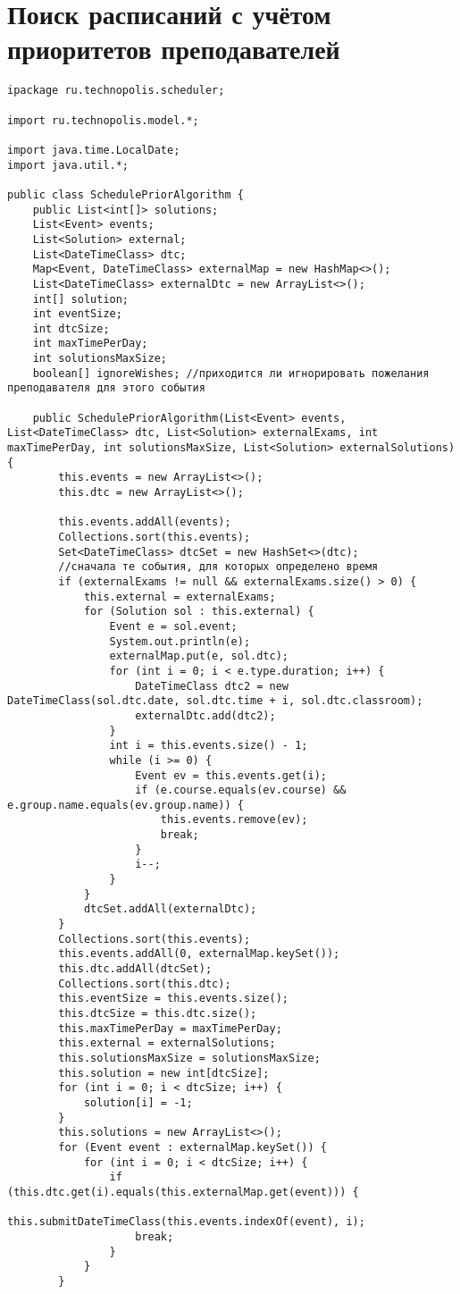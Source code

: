 \chapter{Поиск расписаний с учётом приоритетов преподавателей}\label{appendix-source}	

\begin{lstlisting}
ipackage ru.technopolis.scheduler;

import ru.technopolis.model.*;

import java.time.LocalDate;
import java.util.*;

public class SchedulePriorAlgorithm {
	public List<int[]> solutions;
	List<Event> events;
	List<Solution> external;
	List<DateTimeClass> dtc;
	Map<Event, DateTimeClass> externalMap = new HashMap<>();
	List<DateTimeClass> externalDtc = new ArrayList<>();
	int[] solution;
	int eventSize;
	int dtcSize;
	int maxTimePerDay;
	int solutionsMaxSize;
	boolean[] ignoreWishes; //приходится ли игнорировать пожелания преподавателя для этого события
	
	public SchedulePriorAlgorithm(List<Event> events, List<DateTimeClass> dtc, List<Solution> externalExams, int maxTimePerDay, int solutionsMaxSize, List<Solution> externalSolutions) {
		this.events = new ArrayList<>();
		this.dtc = new ArrayList<>();
		
		this.events.addAll(events);
		Collections.sort(this.events);
		Set<DateTimeClass> dtcSet = new HashSet<>(dtc);
		//сначала те события, для которых определено время
		if (externalExams != null && externalExams.size() > 0) {
			this.external = externalExams;
			for (Solution sol : this.external) {
				Event e = sol.event;
				System.out.println(e);
				externalMap.put(e, sol.dtc);
				for (int i = 0; i < e.type.duration; i++) {
					DateTimeClass dtc2 = new DateTimeClass(sol.dtc.date, sol.dtc.time + i, sol.dtc.classroom);
					externalDtc.add(dtc2);
				}
				int i = this.events.size() - 1;
				while (i >= 0) {
					Event ev = this.events.get(i);
					if (e.course.equals(ev.course) && e.group.name.equals(ev.group.name)) {
						this.events.remove(ev);
						break;
					}
					i--;
				}
			}
			dtcSet.addAll(externalDtc);
		}
		Collections.sort(this.events);
		this.events.addAll(0, externalMap.keySet());
		this.dtc.addAll(dtcSet);
		Collections.sort(this.dtc);
		this.eventSize = this.events.size();
		this.dtcSize = this.dtc.size();
		this.maxTimePerDay = maxTimePerDay;
		this.external = externalSolutions;
		this.solutionsMaxSize = solutionsMaxSize;
		this.solution = new int[dtcSize];
		for (int i = 0; i < dtcSize; i++) {
			solution[i] = -1;
		}
		this.solutions = new ArrayList<>();
		for (Event event : externalMap.keySet()) {
			for (int i = 0; i < dtcSize; i++) {
				if (this.dtc.get(i).equals(this.externalMap.get(event))) {
					this.submitDateTimeClass(this.events.indexOf(event), i);
					break;
				}
			}
		}
		

\end{lstlisting}
